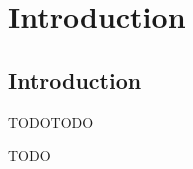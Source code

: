 \section{Introduction}


\subsection{Introduction}

\begin{frame}{TODO}{TODO}

    TODO

\end{frame}
\note{
}
